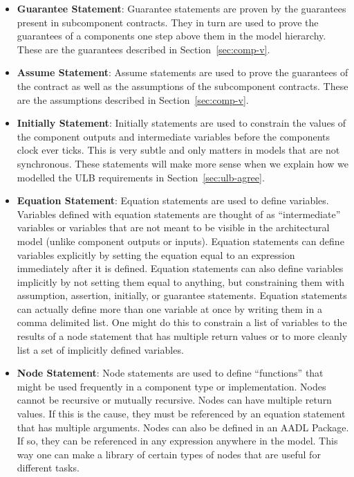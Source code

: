 \documentclass{llncs}
\begin{document}
\begin{itemize}
\item \textbf{Guarantee Statement}: Guarantee statements are proven by the guarantees present in subcomponent contracts.  They in turn are used to prove the guarantees of a components one step above them in the model hierarchy.  These are the guarantees described in Section~\ref{sec:comp-v}.

\item \textbf{Assume Statement}: Assume statements are used to prove the guarantees of the contract as well as the assumptions of the subcomponent contracts. These are the assumptions described in Section~\ref{sec:comp-v}. 

\item \textbf{Initially Statement}: Initially statements are used to constrain the values of the component outputs and intermediate variables before the components clock ever ticks.  This is very subtle and only matters in models that are not synchronous. These statements will make more sense when we explain how we modelled the ULB requirements in Section~\ref{sec:ulb-agree}.

\item \textbf{Equation Statement}: Equation statements are used to define variables.  Variables defined with equation statements are thought of as ``intermediate'' variables or variables that are not meant to be visible in the architectural model (unlike component outputs or inputs).  Equation statements can define variables explicitly by setting the equation equal to an expression immediately after it is defined.  Equation statements can also define variables implicitly by not setting them equal to anything, but constraining them with assumption, assertion, initially, or guarantee statements. Equation statements can actually define more than one variable at once by writing them in a comma delimited list.  One might do this to constrain a list of variables to the results of a node statement that has multiple return values or to more cleanly list a set of implicitly defined variables.

\item \textbf{Node Statement}: Node statements are used to define ``functions'' that might be used frequently in a component type or implementation.  Nodes cannot be recursive or mutually recursive.  Nodes can have multiple return values. If this is the cause, they must be referenced by an equation statement that has multiple arguments. Nodes can also be defined in an AADL Package. If so, they can be referenced in any expression anywhere in the model.  This way one can make a library of certain types of nodes that are useful for different tasks.
\end{itemize}
\end{document}
